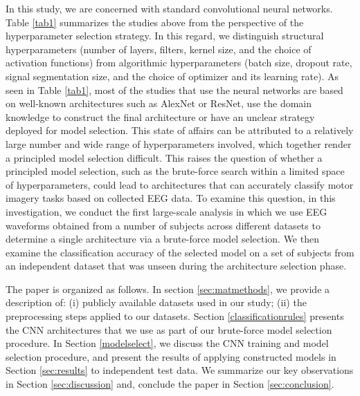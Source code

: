 \documentclass{ieeeaccess}
\begin{document}
In this study, we are concerned with standard convolutional neural networks. Table \ref{tab1} summarizes the studies above from the perspective of the hyperparameter selection strategy.  In this regard, we distinguish structural hyperparameters (number of layers, filters, kernel size, and the choice of activation functions) from algorithmic hyperparameters (batch size, dropout rate, signal segmentation size, and the choice of optimizer and its learning rate). 
As seen in Table \ref{tab1}, most of the studies that use the neural networks are based on well-known architectures such as AlexNet or ResNet, use the domain knowledge to construct the final architecture or have an unclear strategy deployed for model selection. This state of affairs can be attributed to a relatively large number and wide range of hyperparameters involved, which together render a principled model selection difficult. This raises the question of whether a principled model selection, such as the brute-force search within a limited space of hyperparameters, could lead to architectures that can accurately classify motor imagery tasks based on collected EEG data. To examine this question, in this investigation, we conduct the first large-scale analysis in which we use EEG waveforms obtained from a number of subjects across different datasets to determine a single architecture via a brute-force model selection. We then examine the classification accuracy of the selected model on a set of subjects from an independent dataset that was unseen during the architecture selection phase. 

The paper is organized as follows. In section \ref{sec:matmethods}, we provide a description of: (i) publicly available datasets used in our study; (ii) the preprocessing steps applied to our datasets. Section \ref{classificationrules} presents the CNN architectures that we use as part of our brute-force model selection procedure. In Section \ref{modelselect}, we discuss the CNN training and model selection procedure, and present the results of applying constructed models in Section \ref{sec:results} to independent test data. We summarize our key observations in Section \ref{sec:discussion} and, conclude the paper in Section \ref{sec:conclusion}. 
\end{document}
